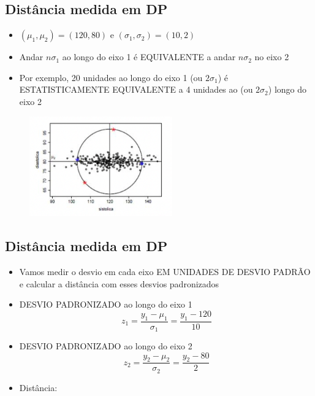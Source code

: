 \documentclass[
  letterpaper,
  DIV=11,
  numbers=noendperiod]{scrartcl}
\providecommand{\tightlist}{%
  \setlength{\itemsep}{0pt}\setlength{\parskip}{0pt}}\usepackage{longtable,booktabs,array}
\begin{document}
\hypertarget{distuxe2ncia-medida-em-dp-1}{%
\subsection{Distância medida em DP}\label{distuxe2ncia-medida-em-dp-1}}

\begin{itemize}
\tightlist
\item
  \((\mu_1,\mu_2) = (120,80)\) e \((\sigma_1, \sigma_2) = (10,2)\)
\item
  Andar \(n\sigma_1\) ao longo do eixo 1 é EQUIVALENTE a andar
  \(n\sigma_2\) no eixo 2
\item
  Por exemplo, 20 unidades ao longo do eixo 1 (ou \(2\sigma_1\)) é
  ESTATISTICAMENTE EQUIVALENTE a 4 unidades ao (ou \(2\sigma_2\)) longo
  do eixo 2
\end{itemize}

\begin{figure}

{\centering \includegraphics[width=0.55\textwidth,height=\textheight]{figs/Aula07/distancia_centro.png}

}

\end{figure}

\hypertarget{distuxe2ncia-medida-em-dp-2}{%
\subsection{Distância medida em DP}\label{distuxe2ncia-medida-em-dp-2}}

\begin{itemize}
\tightlist
\item
  Vamos medir o desvio em cada eixo EM UNIDADES DE DESVIO PADRÃO e
  calcular a distância com esses desvios padronizados
\item
  DESVIO PADRONIZADO ao longo do eixo 1
  \[z_1 = \frac{y_1 - \mu_1}{\sigma_1}= \frac{y_1-120}{10}\]
\item
  DESVIO PADRONIZADO ao longo do eixo 2
  \[z_2 = \frac{y_2 - \mu_2}{\sigma_2}= \frac{y_2-80}{2}\]
\item
  Distância:
\end{itemize}
\end{document}
